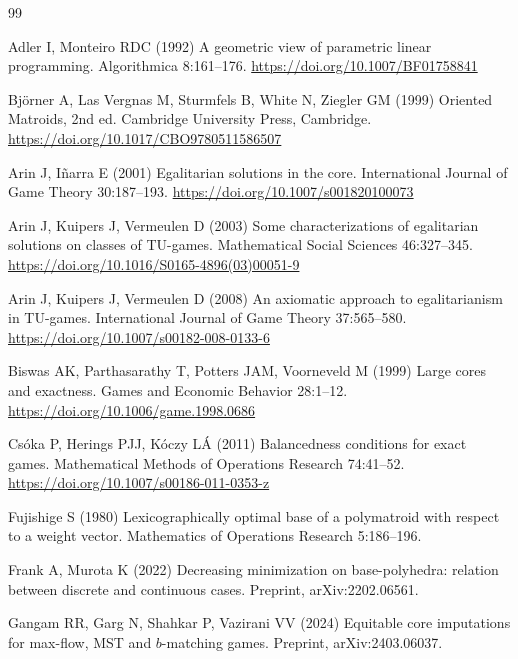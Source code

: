 \documentclass[11pt]{article}
\begin{document}
{\footnotesize
\begin{thebibliography}{99}
\setlength{\itemsep}{0pt}
\setlength{\parsep}{0pt}

Adler I, Monteiro RDC (1992) A geometric view of parametric linear
programming. Algorithmica 8:161--176.
\url{https://doi.org/10.1007/BF01758841}

Bj\"orner A, Las Vergnas M, Sturmfels B, White N, Ziegler GM (1999)
Oriented Matroids, 2nd ed. Cambridge University Press, Cambridge.
\url{https://doi.org/10.1017/CBO9780511586507}

Arin J, I\~narra E (2001) Egalitarian solutions in the core.
International Journal of Game Theory 30:187--193.
\url{https://doi.org/10.1007/s001820100073}

Arin J, Kuipers J, Vermeulen D (2003) Some characterizations of egalitarian
solutions on classes of TU-games. Mathematical Social Sciences 46:327--345.
\url{https://doi.org/10.1016/S0165-4896(03)00051-9}

Arin J, Kuipers J, Vermeulen D (2008) An axiomatic approach to egalitarianism
in TU-games. International Journal of Game Theory 37:565--580.
\url{https://doi.org/10.1007/s00182-008-0133-6}

Biswas AK, Parthasarathy T, Potters JAM, Voorneveld M (1999) Large cores and
exactness. Games and Economic Behavior 28:1--12.
\url{https://doi.org/10.1006/game.1998.0686}

Cs\'oka P, Herings PJJ, K\'oczy L\'A (2011) Balancedness conditions for exact
games. Mathematical Methods of Operations Research 74:41--52.
\url{https://doi.org/10.1007/s00186-011-0353-z}

Fujishige S (1980) Lexicographically optimal base of a polymatroid with
respect to a weight vector. Mathematics of Operations Research 5:186--196.

Frank A, Murota K (2022) Decreasing minimization on base-polyhedra: relation
between discrete and continuous cases. Preprint, arXiv:2202.06561.

Gangam RR, Garg N, Shahkar P, Vazirani VV (2024) Equitable core imputations
for max-flow, MST and $b$-matching games. Preprint, arXiv:2403.06037.


\end{thebibliography}}
\end{document}
